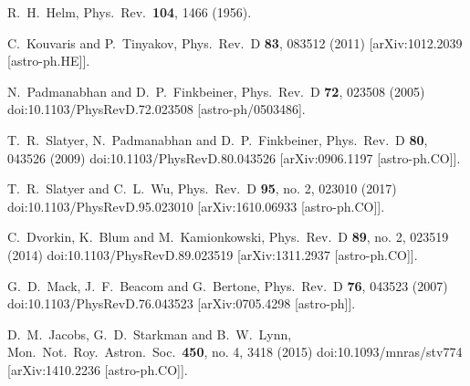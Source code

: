   R.~H.~Helm,
  Phys.\ Rev.\  {\bf 104}, 1466 (1956).


  C.~Kouvaris and P.~Tinyakov,
  Phys.\ Rev.\ D {\bf 83}, 083512 (2011)
  [arXiv:1012.2039 [astro-ph.HE]].
  
  N.~Padmanabhan and D.~P.~Finkbeiner,
  Phys.\ Rev.\ D {\bf 72}, 023508 (2005)
  doi:10.1103/PhysRevD.72.023508
  [astro-ph/0503486].

  T.~R.~Slatyer, N.~Padmanabhan and D.~P.~Finkbeiner,
  Phys.\ Rev.\ D {\bf 80}, 043526 (2009)
  doi:10.1103/PhysRevD.80.043526
  [arXiv:0906.1197 [astro-ph.CO]].

  T.~R.~Slatyer and C.~L.~Wu,
  Phys.\ Rev.\ D {\bf 95}, no. 2, 023010 (2017)
  doi:10.1103/PhysRevD.95.023010
  [arXiv:1610.06933 [astro-ph.CO]].
  
  C.~Dvorkin, K.~Blum and M.~Kamionkowski,
  Phys.\ Rev.\ D {\bf 89}, no. 2, 023519 (2014)
  doi:10.1103/PhysRevD.89.023519
  [arXiv:1311.2937 [astro-ph.CO]].
  
  G.~D.~Mack, J.~F.~Beacom and G.~Bertone,
  Phys.\ Rev.\ D {\bf 76}, 043523 (2007)
  doi:10.1103/PhysRevD.76.043523
  [arXiv:0705.4298 [astro-ph]].

  D.~M.~Jacobs, G.~D.~Starkman and B.~W.~Lynn,
  Mon.\ Not.\ Roy.\ Astron.\ Soc.\  {\bf 450}, no. 4, 3418 (2015)
  doi:10.1093/mnras/stv774
  [arXiv:1410.2236 [astro-ph.CO]].

